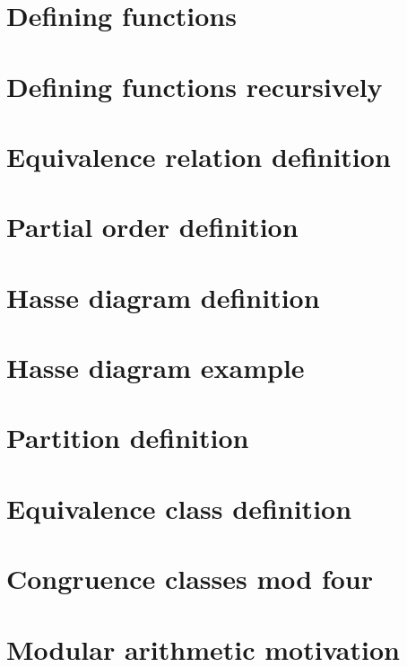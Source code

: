 \section*{Defining functions}

\vfill
\section*{Defining functions recursively}

\vfill
\section*{Equivalence relation definition}

\vfill
\section*{Partial order definition}

\vfill
\section*{Hasse diagram definition}

\vfill
\section*{Hasse diagram example}

\vfill
\section*{Partition definition}

\vfill
\section*{Equivalence class definition}

\vfill
\section*{Congruence classes mod four}

\vfill
\section*{Modular arithmetic motivation}

\vfill
